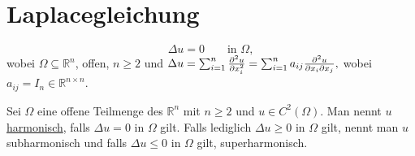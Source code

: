 \section{Laplacegleichung} 
\label{sec:laplacegleichung}

\begin{equation}
	\Delta u = 0 \qquad \text{in }\Omega,
\end{equation}
wobei $\Omega \subseteq \mathbb{R}^n$, offen, $n \geq 2$ und $\Delta u = \sum^{n}_{i=1} \frac{{\partial ^2u}}{{\partial x_i^2}}  = \sum^{n}_{i=1} a_{ij} \frac{{\partial ^2u}}{{\partial x_i \partial x_j}} ,$ wobei $a_{ij}= I_n \in \mathbb{R}^{n \times n}$.

\begin{definition}
	Sei $\Omega$ eine offene Teilmenge des $\mathbb{R}^n$ mit $n \geq 2$ und $u \in C^2(\Omega)$. 
	Man nennt $u$ \underline{harmonisch}, falls $\Delta u = 0$ in $\Omega$ gilt. Falls lediglich $\Delta u \geq 0$ in $\Omega$ gilt, nennt man $u$ subharmonisch und falls $\Delta u \leq 0$ in $\Omega$ gilt, superharmonisch.
\end{definition}
	

